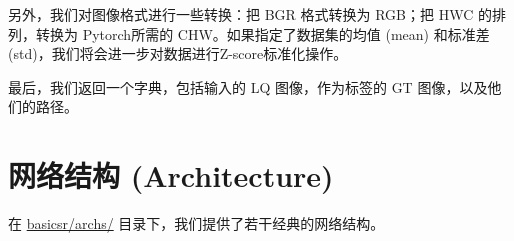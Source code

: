 \documentclass[../main.tex]{subfiles}
\begin{document}
另外，我们对图像格式进行一些转换：把 BGR 格式转换为 RGB；把 HWC 的排列，转换为 Pytorch所需的 CHW。如果指定了数据集的均值 (mean) 和标准差 (std)，我们将会进一步对数据进行Z-score标准化操作。

最后，我们返回一个字典，包括输入的 LQ 图像，作为标签的 GT 图像，以及他们的路径。


\section{网络结构 (Architecture)} \label{code_structure:arch}
在 \href{https://github.com/XPixelGroup/BasicSR/tree/master/basicsr/archs}{basicsr/archs/} 目录下，我们提供了若干经典的网络结构。
\end{document}
